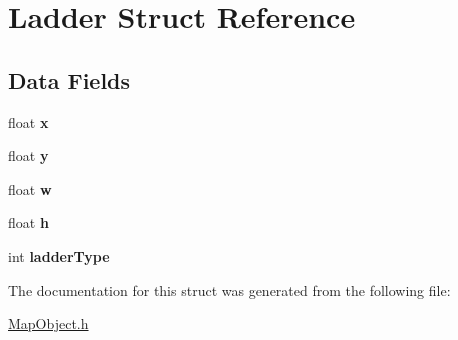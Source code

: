 \hypertarget{struct_ladder}{}\section{Ladder Struct Reference}
\label{struct_ladder}
\subsection*{Data Fields}
\begin{DoxyCompactItemize}
\item 
\hypertarget{struct_ladder_ad0da36b2558901e21e7a30f6c227a45e}{}float {\bfseries x}\label{struct_ladder_ad0da36b2558901e21e7a30f6c227a45e}

\item 
\hypertarget{struct_ladder_aa4f0d3eebc3c443f9be81bf48561a217}{}float {\bfseries y}\label{struct_ladder_aa4f0d3eebc3c443f9be81bf48561a217}

\item 
\hypertarget{struct_ladder_a56eca241e2896b9f57a79589e76fd24b}{}float {\bfseries w}\label{struct_ladder_a56eca241e2896b9f57a79589e76fd24b}

\item 
\hypertarget{struct_ladder_a85f2f1bd58b3b44ffdf3881823393959}{}float {\bfseries h}\label{struct_ladder_a85f2f1bd58b3b44ffdf3881823393959}

\item 
\hypertarget{struct_ladder_afaf91799b6b97996e1a7e64b44b0ff92}{}int {\bfseries ladder\+Type}\label{struct_ladder_afaf91799b6b97996e1a7e64b44b0ff92}

\end{DoxyCompactItemize}


The documentation for this struct was generated from the following file\+:\begin{DoxyCompactItemize}
\item 
\hyperlink{_map_object_8h}{Map\+Object.\+h}\end{DoxyCompactItemize}
